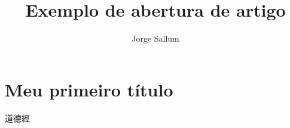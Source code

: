 \documentclass{memoir}
\title{Exemplo de abertura de artigo}
\author{Jorge Sallum}
\newcommand{\chin}[1]{{\normalfont\china #1}}
\newcommand{\testechines}{\chin{道德經}}
\begin{document}
 

\maketitle
 

\chapter*{Meu primeiro título}

\testechines



 
\end{document}
